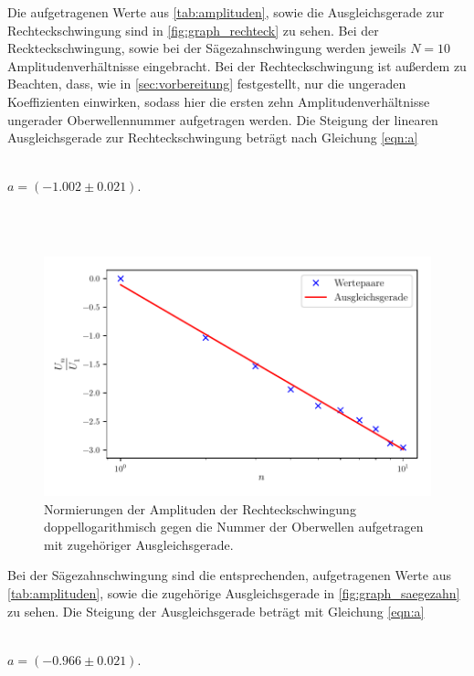Die aufgetragenen Werte aus \autoref{tab:amplituden}, 
sowie die Ausgleichsgerade zur Rechteckschwingung sind in \autoref{fig:graph_rechteck} zu sehen.
Bei der Reckteckschwingung, sowie bei der Sägezahnschwingung werden jeweils $N = 10$ Amplitudenverhältnisse eingebracht.
Bei der Rechteckschwingung ist außerdem zu Beachten, dass, wie in \autoref{sec:vorbereitung} festgestellt, nur die 
ungeraden Koeffizienten einwirken, sodass hier die ersten zehn Amplitudenverhältnisse ungerader Oberwellennummer aufgetragen
werden.
Die Steigung der linearen Ausgleichsgerade zur Rechteckschwingung beträgt nach Gleichung \eqref{eqn:a}
\\ \\
\centerline{$a = ( -1.002 \pm 0.021 ) $.}
\\ \\
\begin{figure}
  \centering
  \includegraphics{build/rechteck.pdf}
  \caption{Normierungen der Amplituden der Rechteckschwingung doppellogarithmisch gegen die Nummer der Oberwellen aufgetragen mit zugehöriger Ausgleichsgerade.}
  \label{fig:graph_rechteck}
\end{figure}
Bei der Sägezahnschwingung sind die entsprechenden, aufgetragenen Werte aus \autoref{tab:amplituden}, sowie die zugehörige Ausgleichsgerade
in \autoref{fig:graph_saegezahn} zu sehen. 
Die Steigung der Ausgleichsgerade beträgt mit Gleichung \eqref{eqn:a}
\\ \\ 
\centerline{$ a = (- 0.966 \pm 0.021)$.}
\\ \\
